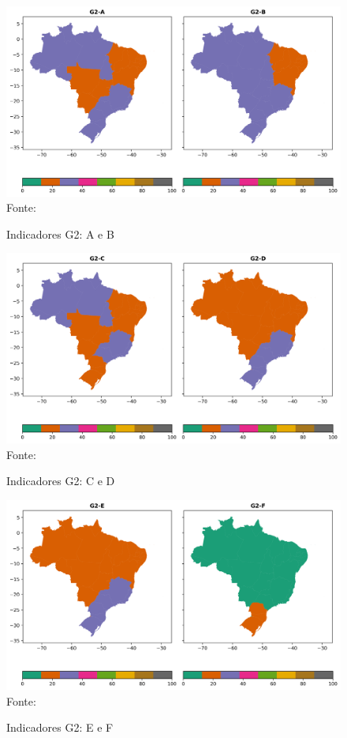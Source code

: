 \begin{figure}[H]
	\centering
	\caption{Indicadores G2: A e B}
	\includegraphics[width=1\linewidth]{figuras/mapa_coropleto_tic_domicilio_g2_A_B.png}
	\label{fig:mapa_coropleto_tic_domicilio_g2_A_B}
	\footnotesize{Fonte: \cite{tic_domicilios_2024_g2}}
\end{figure}

\begin{figure}[H]
	\centering
	\caption{Indicadores G2: C e D}
	\includegraphics[width=1\linewidth]{figuras/mapa_coropleto_tic_domicilio_g2_C_D.png}
	\label{fig:mapa_coropleto_tic_domicilio_g2_C_D}
	\footnotesize{Fonte: \cite{tic_domicilios_2024_g2}}
\end{figure}

\begin{figure}[H]
	\centering
	\caption{Indicadores G2: E e F}
	\includegraphics[width=1\linewidth]{figuras/mapa_coropleto_tic_domicilio_g2_E_F.png}
	\label{fig:mapa_coropleto_tic_domicilio_g2_E_F}
	\footnotesize{Fonte: \cite{tic_domicilios_2024_g2}}
\end{figure}

